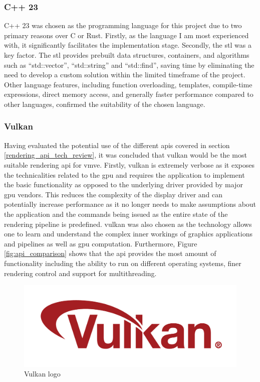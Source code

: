 \documentclass[11pt]{article}
\begin{document}
\subsubsection{C++ 23}
C++ 23 was chosen as the programming language for this project due to two
primary reasons over C or Rust. Firstly, as the language I am most experienced
with, it significantly facilitates the implementation stage. Secondly, the
\gls*{stl} was a key factor. The \gls*{stl} provides prebuilt data structures,
containers, and algorithms such as ``std::vector'', ``std::string'' and
``std::find'', saving time by eliminating the need to develop a custom solution
within the limited timeframe of the project. Other language features, including
function overloading, templates, compile-time expressions, direct memory access,
and generally faster performance compared to other languages, confirmed the
suitability of the chosen language. 

\subsubsection{Vulkan} \label{rendering_api}
Having evaluated the potential use of the different \glspl*{api} covered in
section \ref{rendering_api_tech_review}, it was concluded that \gls*{vulkan}
would be the most suitable rendering \gls*{api} for \gls*{vmve}. Firstly,
\gls*{vulkan} is extremely verbose as it exposes the technicalities related to
the \gls*{gpu} and requires the application to implement the basic functionality
as opposed to the underlying driver provided by major \gls*{gpu} vendors. This
reduces the complexity of the display driver and can potentially increase
performance as it no longer needs to make assumptions about the application and
the commands being issued as the entire state of the rendering pipeline is
predefined. \gls*{vulkan} was also chosen as the technology allows one to learn
and understand the complex inner workings of graphics applications and pipelines
as well as \gls*{gpu} computation. Furthermore, Figure \ref{fig:api_comparison}
shows that the \gls*{api} provides the most amount of functionality including
the ability to run on different operating systems, finer rendering control and
support for multithreading.

\begin{figure}[H]
  \centering
  \includegraphics[width=\textwidth]{images/vulkan_logo.png}
  \caption{Vulkan logo \cite{vulkan}}
  \label{fig:vulkan_logo}
\end{figure}
\end{document}
